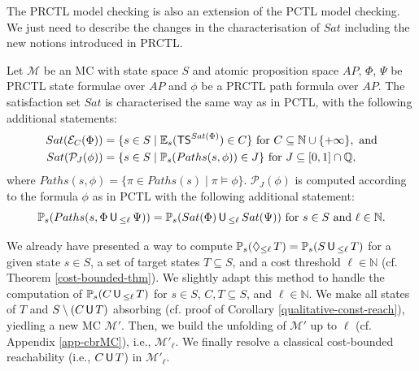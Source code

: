 The PRCTL model checking is also an extension of the PCTL model checking. We just need to describe the changes in the
characterisation of $Sat$ including the new notions introduced in PRCTL.
\begin{property}
  Let $\mathcal{M}$ be an MC with state space $S$ and atomic proposition space $AP$, $\Phi$, $\Psi$ be PRCTL state formulae over $AP$ and $\phi$ be a PRCTL path formula over $AP$. The satisfaction set $Sat$ is characterised the same way as in PCTL, with the following additional statements:
  \begin{align*}
    Sat(\mathcal{E}_C(\Phi)) &= \{ s \in S \; | \; \mathbb{E}_s(\text{\sffamily TS}^{Sat(\Phi)}) \in C \} \text{ for } C \subseteq \mathbb{N} \cup \{+\infty\}, \text{ and} \\
    Sat(\mathcal{P}_J(\phi)) &= \{ s \in S \; | \; \mathbb{P}_s (Paths(s, \phi)) \in J \} \text{ for } J \subseteq [0, 1] \cap \mathbb{Q},
  \end{align*}
    where $Paths(s, \phi) = \{ \pi \in Paths(s) \; | \; \pi \models \phi \}$.
    $\mathcal{P}_J(\phi)$ is computed according to the formula $\phi$ as in PCTL with the following additional statement:
  \[
    \mathbb{P}_s(Paths(s, \Phi \,\text{\sffamily U}\,_{\leq \ell}\, \Psi)) = \mathbb{P}_s(Sat(\Phi) \,\text{\sffamily U}\,_{\leq \ell} \, Sat(\Psi)) \text{ for } s \in S \text{ and } \ell \in \mathbb{N}.
  \]
\end{property}

We already have presented a way to compute $\mathbb{P}_s(\Diamond_{\leq \ell}\, T) = \mathbb{P}_s(S \,\text{\sffamily U}\,_{\leq \ell}\, T)$ for a given state $s \in S$, a set of target states $T \subseteq S$, and a cost threshold $\ell \in \mathbb{N}$ (cf. Theorem \ref{cost-bounded-thm}).
We slightly adapt this method to handle the computation of $\mathbb{P}_s(C \,\text{\sffamily U}\,_{\leq \ell}\, T)$ for $s \in S$, $C, T \subseteq S$, and $\ell \in \mathbb{N}$.
We make all states of $T$ and $S \setminus (C \,\text{\sffamily U}\, T)$ absorbing (cf.  proof of Corollary \ref{qualitative-const-reach}), yiedling a new MC $\mathcal{M}'$.
Then, we build the unfolding of $\mathcal{M}'$ up to $\ell$ (cf. Appendix \ref{app-cbrMC}), i.e., $\mathcal{M}'_{\ell}$.
We finally resolve a classical cost-bounded reachability (i.e., $C \,\text{\sffamily U}\, T$) in $\mathcal{M}'_{\ell}$.

